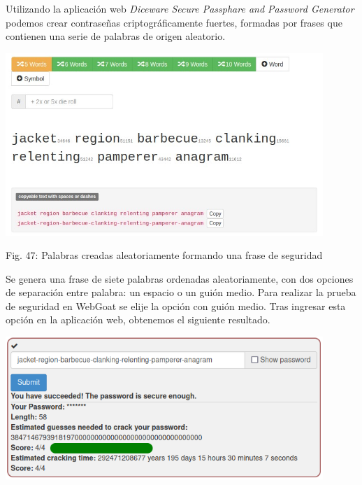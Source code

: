 \documentclass[12pt,oneside,a4paper]{book}
\begin{document}
\begin{enumerate}
\begin{enumerate}
        \vspace{1em}

        \hspace{20pt}
        Utilizando la aplicación web \textit{Diceware Secure Passphare and Password Generator} podemos crear contraseñas criptográficamente fuertes, formadas por frases que contienen una serie de palabras de origen aleatorio.
        
        \newpage
        
        \begin{center}
            \includegraphics[width=12cm]{img/web-secure-password1.png}
            
            \vspace{0.1em}
            
            Fig. 47: Palabras creadas aleatoriamente formando una frase de seguridad
        \end{center}
        
        \vspace{2em}

        \hspace{20pt}
        Se genera una frase de siete palabras ordenadas aleatoriamente, con dos opciones de separación entre palabra: un espacio o un guión medio. Para realizar la prueba de seguridad en WebGoat se elije la opción con guión medio. Tras ingresar esta opción en la aplicación web, obtenemos el siguiente resultado.
        
        \vspace{2em}
        
        \begin{center}
            \includegraphics[width=12cm]{img/9.png}
            

\end{center}
\end{enumerate}
\end{enumerate}
\end{document}
